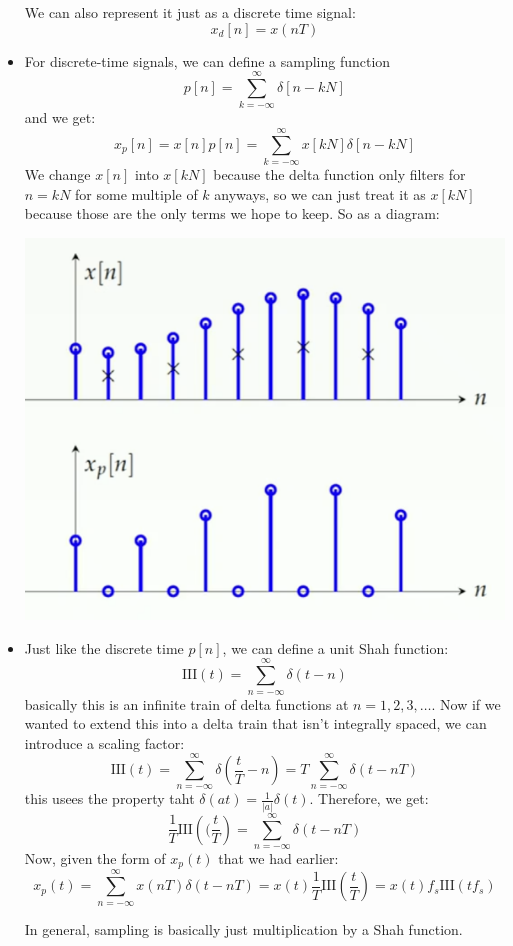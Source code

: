 \begin{itemize}
		We can also 
		represent it just as a discrete time signal:
		\[
			x_d[n] = x(nT)
		\] 
	\item For discrete-time signals, we can define a sampling function
		\[
			p[n] = \sum_{k=-\infty}^{\infty} \delta[n - kN]
		\] 
		and we get:
		\[
			x_p[n] = x[n] p[n] = \sum_{k=-\infty}^{\infty} x[kN] \delta[n - kN]
		\] 
		We change \( x[n] \) into \( x[kN] \) because the delta function only filters for \( n = kN \) for some 
		multiple of \( k \) anyways, so we can just treat it as \( x[kN] \) because those are the only terms 
		we hope to keep. So as a diagram:
		\begin{center}
			\includegraphics[scale=0.8]{discreteSample.png}
		\end{center}
	\item Just like the discrete time \( p[n] \), we can define a unit Shah function:
		\[
			\mathrm{III}(t) = \sum_{n=-\infty}^{\infty} \delta(t - n)
		\] 
		basically this is an infinite train of delta functions at \( n = 1, 2, 3, \dots \). Now if we wanted 
		to extend this into a delta train that isn't integrally spaced, we can introduce a scaling factor:
		\[
		\text{III}(t) = \sum_{n=-\infty}^{\infty} \delta\left( \frac{t}{T} - n \right) = T
		\sum_{n=-\infty}^{\infty} \delta(t - nT)
		\] 
		this usees the property taht \( \delta(at) = \frac{1}{|a|}\delta(t)  \). Therefore, we get:
		\[
		\frac{1}{T}\text{III}\left( (\frac{t}{T} \right) = \sum_{n=-\infty}^{\infty} \delta(t - nT)
		\] 
		Now, given the form of \( x_p(t)  \) that we had earlier:
		\[
		x_p(t) = \sum_{n=-\infty}^{\infty} x(nT) \delta(t - nT) = x(t) \frac{1}{T}\text{III}\left( \frac{t}{T} \right) 
		= x(t) f_s \text{III}(tf_s)
		\] 

		In general, sampling is basically just multiplication by a Shah function. 
\end{itemize}
